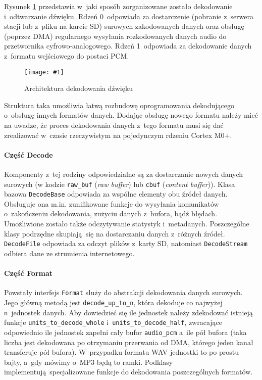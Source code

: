 \documentclass[polish]{aghengthesis}
\newcommand{\imgint}[4]{
	\begin{figure}[{#4}]
		\centering
		\texttt{[image: \#1]}
		\caption{#2}
		\label{#1}
	\end{figure}
}
\newcommand{\imgh}[3]{\imgint{#1}{#2}{#3}{H}}
\begin{document}
			Rysunek \ref{3/PicoRadio-sound-decoding} przedstawia w~jaki sposób zorganizowane zostało dekodowanie i~odtwarzanie dźwięku.
			Rdzeń 0~odpowiada za dostarczenie (pobranie z~serwera stacji lub z~pliku na karcie SD) surowych zakodowanych danych oraz obsługę (poprzez DMA) regularnego wysyłania rozkodowanych danych audio do przetwornika cyfrowo-analogowego.
			Rdzeń 1~odpowiada za dekodowanie danych z~formatu wejściowego do postaci PCM.
			\imgh{3/PicoRadio-sound-decoding}{Architektura dekodowania dźwięku}{0.95}
			
			Struktura taka umożliwia łatwą rozbudowę oprogramowania dekodującego o~obsługę innych formatów danych. Dodając obsługę nowego formatu należy mieć na uwadze, że proces dekodowania danych z~tego formatu musi się dać zrealizować w~czasie rzeczywistym na pojedynczym rdzeniu Cortex M0+.
			
		
			\paragraph{Część Decode}
				Komponenty z~tej rodziny odpowiedzialne są za dostarczanie nowych danych surowych (w kodzie \lstinline|raw_buf| (\textit{raw buffer}) lub \lstinline|cbuf| (\textit{content buffer})). Klasa bazowa \lstinline|DecodeBase| odpowiada za wspólne elementy obu źródeł danych. Obsługuje ona m.in. zunifikowane funkcje do wysyłania komunikatów o~zakończeniu dekodowania, zużyciu danych z~bufora, bądź błędach. Umożliwione zostało także odczytywanie statystyk i~metadanych. Poszczególne klasy podrzędne skupiają się na dostarczaniu danych z~różnych źródeł. \lstinline|DecodeFile| odpowiada za odczyt plików z~karty SD, natomiast \lstinline|DecodeStream| odbiera dane ze strumienia internetowego.
			
			\paragraph{Część Format}
				Powstały interfejs \lstinline|Format| służy do abstrakcji dekodowania danych surowych. Jego główną metodą jest \lstinline|decode_up_to_n|, która dekoduje co najwyżej \lstinline|n|~jednostek danych. Aby dowiedzieć się ile jednostek należy zdekodować istnieją funkcje \lstinline|units_to_decode_whole| i~\lstinline|units_to_decode_half|, zwracające odpowiednio ile jednostek zapełni cały bufor \lstinline|audio_pcm| a~ile pół bufora (taka liczba jest dekodowana po otrzymaniu przerwania od DMA, którego jeden kanał transferuje pół bufora). W~przypadku formatu WAV jednostki to po prostu bajty, a~gdy mówimy o~MP3 będą to ramki. Podklasy implementują specjalizowane funkcje do dekodowania poszczególnych formatów.
			
\end{document}
